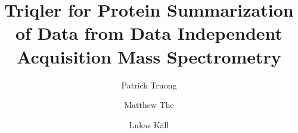 \title{Triqler for Protein Summarization of Data from Data Independent Acquisition Mass Spectrometry}
\author{Patrick Truong \and Matthew The \and Lukas K\"{a}ll}
